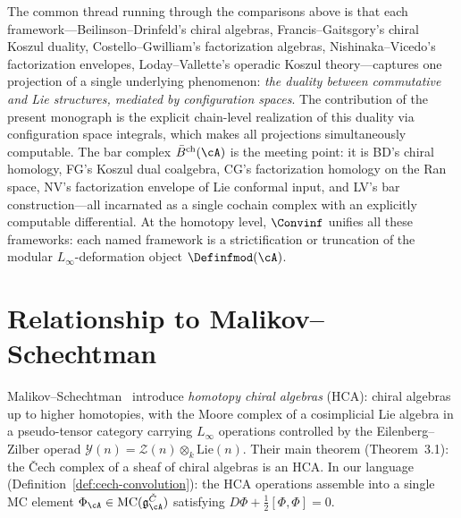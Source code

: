 \begin{remark}[Overview]\label{rem:concordance-synthesis}
The common thread running through the comparisons above is that each
framework---Beilinson--Drinfeld's chiral algebras, Francis--Gaitsgory's
chiral Koszul duality, Costello--Gwilliam's factorization algebras,
Nishinaka--Vicedo's factorization envelopes,
Loday--Vallette's operadic Koszul theory---captures one projection of a
single underlying phenomenon: \emph{the duality between commutative and
Lie structures, mediated by configuration spaces}.  The contribution of
the present monograph is the explicit chain-level realization of this
duality via configuration space integrals, which makes all projections
simultaneously computable.  The bar complex $\bar{B}^{\mathrm{ch}}(\cA)$
is the meeting point: it is BD's chiral homology, FG's Koszul dual
coalgebra, CG's factorization homology on the Ran space, NV's
factorization envelope of Lie conformal input, and LV's bar
construction---all incarnated as a single cochain complex with an
explicitly computable differential.
At the homotopy level, $\Convinf$ unifies all these frameworks:
each named framework is a strictification or truncation of the
modular $L_\infty$-deformation object $\Definfmod(\cA)$.
\end{remark}

\section{Relationship to Malikov--Schechtman}
\label{sec:concordance-malikov-schechtman}

Malikov--Schechtman~\cite{MS24} introduce \emph{homotopy chiral algebras}
(HCA): chiral algebras up to higher homotopies, with the Moore complex of
a cosimplicial Lie algebra in a pseudo-tensor category carrying $L_\infty$
operations controlled by the Eilenberg--Zilber operad
$\mathcal{Y}(n) = \mathcal{Z}(n) \otimes_k \mathrm{Lie}(n)$.  Their main
theorem (Theorem~3.1): the \v{C}ech complex of a sheaf of chiral algebras
is an HCA\@.  In our language (Definition~\ref{def:cech-convolution}):
the HCA operations assemble into a single MC element
$\Phi_\cA \in \operatorname{MC}(\mathfrak{g}^{\check{C}}_{\cA})$
satisfying $D\Phi + \tfrac{1}{2}[\Phi,\Phi] = 0$.

